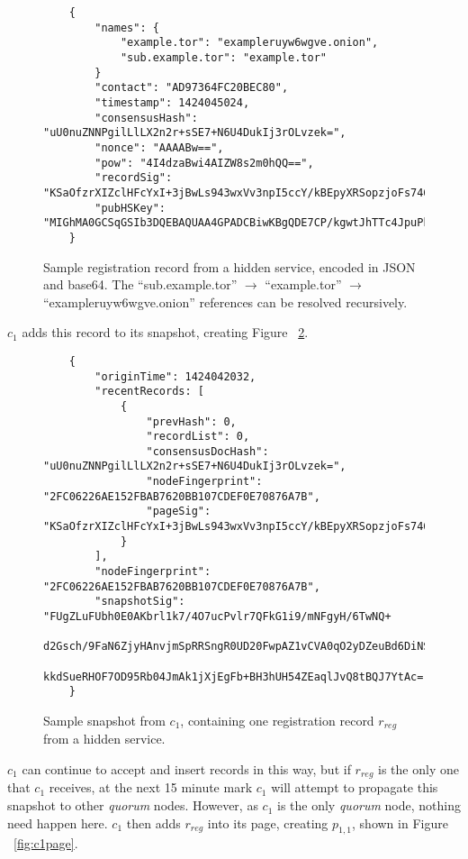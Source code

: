 \begin{figure}
	\begin{lstlisting}
	{
		"names": {
			"example.tor": "exampleruyw6wgve.onion",
			"sub.example.tor": "example.tor"
		}
		"contact": "AD97364FC20BEC80",
		"timestamp": 1424045024,
		"consensusHash": "uU0nuZNNPgilLlLX2n2r+sSE7+N6U4DukIj3rOLvzek=",
		"nonce": "AAAABw==",
		"pow": "4I4dzaBwi4AIZW8s2m0hQQ==",
		"recordSig": 	"KSaOfzrXIZclHFcYxI+3jBwLs943wxVv3npI5ccY/kBEpyXRSopzjoFs746n0tJqUpdY4Kbe6DBwERaN7ELmSSK9Pu6q8QeKzNAh+QOnKl0fKBN7fqowjkQ3ktFkR0Vuox9WrrbNTMa4+up0Np52hlbKA3zSRz4fbR9NVlh6uuQ=",
		"pubHSKey": "MIGhMA0GCSqGSIb3DQEBAQUAA4GPADCBiwKBgQDE7CP/kgwtJhTTc4JpuPkvA7Ln9wgc+fgTKgkyUp1zusxgUAn1c1MGx4YhO42KPB7dyZOf3pcRk94XsYFY1ULkF2+tf9KdNe7GFzJyMFCQENnUcVXbcwLH4vAeiGK7R/nScbCbyc9LT+VE1fbKchTL1QzLVBLqJTxhR+9YPi8x+QIFAdZ8BJs="
	}
	\end{lstlisting}
	\caption{Sample registration record from a hidden service, encoded in JSON and base64. The ``sub.example.tor'' $ \to $ ``example.tor'' $ \to $ ``exampleruyw6wgve.onion'' references can be resolved recursively.}
	\label{fig:sampleRecord}
\end{figure}

$ c_{1} $ adds this record to its snapshot, creating Figure ~\ref{fig:sampleSnapshot}.

\begin{figure}
	\begin{lstlisting}
	{
		"originTime": 1424042032,
		"recentRecords: [
			{
				"prevHash": 0,
				"recordList": 0,
				"consensusDocHash": "uU0nuZNNPgilLlLX2n2r+sSE7+N6U4DukIj3rOLvzek=",
				"nodeFingerprint": "2FC06226AE152FBAB7620BB107CDEF0E70876A7B",
				"pageSig": 	"KSaOfzrXIZclHFcYxI+3jBwLs943wxVv3npI5ccY/kBEpyXRSopzjoFs746n0tJqUpdY4Kbe6DBwERaN7ELmSSK9Pu6q8QeKzNAh+QOnKl0fKBN7fqowjkQ3ktFkR0Vuox9WrrbNTMa4+up0Np52hlbKA3zSRz4fbR9NVlh6uuQ="
			}
		],
		"nodeFingerprint": "2FC06226AE152FBAB7620BB107CDEF0E70876A7B",
		"snapshotSig": "FUgZLuFUbh0E0AKbrl1k7/4O7ucPvlr7QFkG1i9/mNFgyH/6TwNQ+
			d2Gsch/9FaN6ZjyHAnvjmSpRRSngR0UD20FwpAZ1vCVA0qO2yDZeuBd6DiNS
			kkdSueRHOF7OD95Rb04JmAk1jXjEgFb+BH3hUH54ZEaqlJvQ8tBQJ7YtAc="
	}
	\end{lstlisting}
	\caption{Sample snapshot from $ c_{1} $, containing one registration record $ r_{reg} $ from a hidden service.}
	\label{fig:sampleSnapshot}
\end{figure}

$ c_{1} $ can continue to accept and insert records in this way, but if $ r_{reg} $ is the only one that $ c_{1} $ receives, at the next 15 minute mark $ c_{1} $ will attempt to propagate this snapshot to other \emph{quorum} nodes. However, as $ c_{1} $ is the only \emph{quorum} node, nothing need happen here. $ c_{1} $ then adds $ r_{reg} $ into its page, creating $ p_{1,1} $, shown in Figure ~\ref{fig:c1page}.

